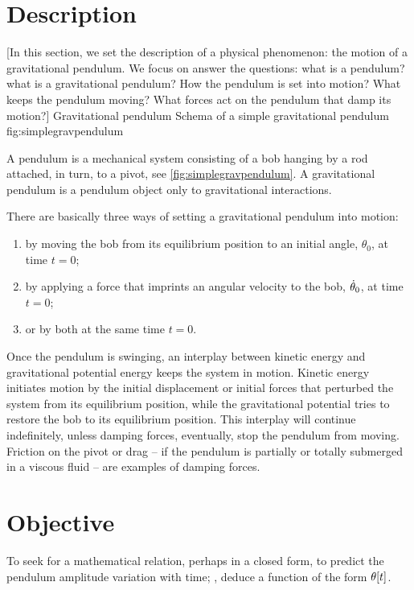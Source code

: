 \section{Description}
[In this section, we set the description of a physical phenomenon: the motion of a gravitational pendulum. We focus on answer the questions: what is a pendulum? what is a gravitational pendulum? How the pendulum is set into motion? What keeps the pendulum moving? What forces act on the pendulum that damp its motion?]
%
%
   {Gravitational pendulum}
   {Schema of a simple gravitational pendulum}%
   {fig:simplegravpendulum}%

A pendulum is a mechanical system consisting of a bob hanging by a rod attached, in turn, to a pivot, see \cref{fig:simplegravpendulum}. A gravitational pendulum is a pendulum object only to gravitational interactions. 

There are basically three ways of setting a gravitational pendulum into motion:
\begin{enumerate}
\item by moving the bob from its equilibrium position to an initial angle, $\theta_0$, at time $t = 0$;
\item by applying a force that imprints an angular velocity to the bob, $\dot{\theta}_0$, at time $t = 0$;
\item or by both at the same time $t = 0$.
\end{enumerate}

Once the pendulum is swinging, an interplay between kinetic energy and gravitational potential energy keeps the system in motion. Kinetic energy initiates motion by the initial displacement or initial forces that perturbed the system from its equilibrium position, while the gravitational potential tries to restore the bob to its equilibrium position. This interplay will continue indefinitely, unless damping forces, eventually, stop the pendulum from moving. Friction on the pivot or drag -- if the pendulum is partially or totally submerged in a viscous fluid -- are examples of damping forces.

\section{Objective}
To seek for a mathematical relation, perhaps in a closed form, to predict the pendulum amplitude variation with time; \ie, deduce a function of the form $\theta\!\left[{t}\right]$. 
